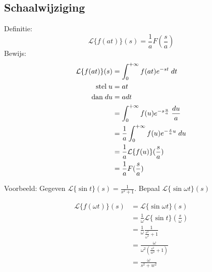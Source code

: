 \documentclass[12pt]{report}
\newcommand{\example}[2]{
    \hrulefill
    
    Voorbeeld: #1
    
    #2
    
    \hrulefill
}
\begin{document}
\subsection{Schaalwijziging}
Definitie:
$$\mathcal{L}\{f(at)\}(s) = \frac{1}{a}F(\frac{s}{a})$$
Bewijs:
\begin{equation*}
 \begin{split}
  \mathcal{L}\{f(at)\}(s) & = \int_{0}^{+\infty}f(at)e^{-st}\;dt \\
                    \hbox{stel}\; u & = at \\
                    \hbox{dan}\; du & = adt \\
                          & =  \int_{0}^{+\infty}f(u)e^{-s\frac{u}{a}}\;\frac{du}{a} \\
                          & =  \frac{1}{a}\int_{0}^{+\infty}f(u)e^{-\frac{s}{a}u}\;du \\
                          & =  \frac{1}{a}\mathcal{L}\{f(u)\}(\frac{s}{a}) \\
                          & =  \frac{1}{a}F(\frac{s}{a})
 \end{split}
\end{equation*}
\example{Gegeven $\mathcal{L}\{\sin t\}(s) = \frac{1}{s^2 + 1}$. Bepaal $\mathcal{L}\{\sin \omega t\}(s)$}
{
\begin{equation*}
 \begin{split}
  \mathcal{L}\{f(\omega t)\}(s) & = \mathcal{L}\{\sin \omega t\}(s) \\
                                & = \frac{1}{\omega}\mathcal{L}\{\sin t\}(\frac{s}{\omega}) \\
                                & = \frac{1}{\omega}\frac{1}{\frac{s^2}{\omega^2} + 1} \\
                                & = \frac{\omega}{\omega^2(\frac{s^2}{w^2} + 1)} \\
                                & = \frac{\omega}{s^2 + w^2}
 \end{split}
\end{equation*}}
\end{document}
